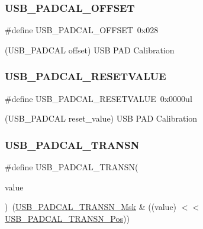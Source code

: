 \subsubsection{\texorpdfstring{USB\_PADCAL\_OFFSET}{USB\_PADCAL\_OFFSET}}
{\footnotesize\ttfamily \#define U\+S\+B\+\_\+\+P\+A\+D\+C\+A\+L\+\_\+\+O\+F\+F\+S\+ET~0x028}



(U\+S\+B\+\_\+\+P\+A\+D\+C\+AL offset) U\+SB P\+AD Calibration 

\mbox{\label{group___s_a_m_d21___u_s_b_ga6c7b2cef3d26f85db52daf52360cb8ec}} 
\subsubsection{\texorpdfstring{USB\_PADCAL\_RESETVALUE}{USB\_PADCAL\_RESETVALUE}}
{\footnotesize\ttfamily \#define U\+S\+B\+\_\+\+P\+A\+D\+C\+A\+L\+\_\+\+R\+E\+S\+E\+T\+V\+A\+L\+UE~0x0000ul}



(U\+S\+B\+\_\+\+P\+A\+D\+C\+AL reset\+\_\+value) U\+SB P\+AD Calibration 

\mbox{\label{group___s_a_m_d21___u_s_b_ga834cb9d82fbe981c6c8beb499ea34a1f}} 
\subsubsection{\texorpdfstring{USB\_PADCAL\_TRANSN}{USB\_PADCAL\_TRANSN}}
{\footnotesize\ttfamily \#define U\+S\+B\+\_\+\+P\+A\+D\+C\+A\+L\+\_\+\+T\+R\+A\+N\+SN(\begin{DoxyParamCaption}\item[{}]{value }\end{DoxyParamCaption})~(\mbox{\hyperlink{group___s_a_m_d21___u_s_b_gaa0aa6da552d6c485f8b82e68df67abff}{U\+S\+B\+\_\+\+P\+A\+D\+C\+A\+L\+\_\+\+T\+R\+A\+N\+S\+N\+\_\+\+Msk}} \& ((value) $<$$<$ \mbox{\hyperlink{group___s_a_m_d21___u_s_b_ga754c140a8bdd5eb6cff99bca755b8153}{U\+S\+B\+\_\+\+P\+A\+D\+C\+A\+L\+\_\+\+T\+R\+A\+N\+S\+N\+\_\+\+Pos}}))}


